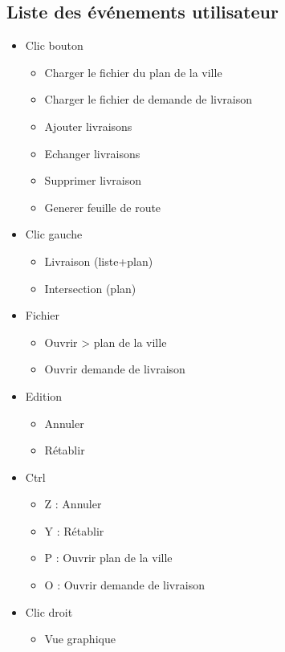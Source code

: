 \documentclass[10pt,a4paper]{book}
\begin{document}
\subsection{Liste des événements utilisateur}
\begin{itemize}
	\item{Clic bouton}
	\begin{itemize}
		\item{Charger le fichier du plan de la ville}
		\item{Charger le fichier de demande de livraison}
		\item{Ajouter livraisons}
		\item{Echanger livraisons}
		\item{Supprimer livraison}
		\item{Generer feuille de route}
	\end{itemize}
	\item{Clic gauche}
	\begin{itemize}
		\item{Livraison (liste+plan)}
		\item{Intersection (plan)}	
	\end{itemize}
	\item{Fichier}
	\begin{itemize}
		\item{Ouvrir > plan de la ville}
		\item{Ouvrir demande de livraison}
	\end{itemize}
	\item{Edition}	
	\begin{itemize}
		\item{Annuler}
		\item{Rétablir}
	\end{itemize}
	\item{Ctrl}
	\begin{itemize}
		\item{Z : Annuler}
		\item{Y : Rétablir}
		\item{P : Ouvrir plan de la ville}
		\item{O : Ouvrir demande de livraison}
	\end{itemize}
	\item{Clic droit}
	\begin{itemize}
		\item{Vue graphique}
	\end{itemize}	
\end{itemize}
\newpage
\end{document}
